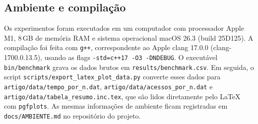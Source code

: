 \subsection{Ambiente e compilação}

Os experimentos foram executados em um computador com processador Apple M1, 8\,GB de memória RAM e sistema operacional macOS 26.3 (build 25D125). A compilação foi feita com \texttt{g++}, correspondente ao Apple clang 17.0.0 (clang-1700.0.13.5), usando as flags \texttt{-std=c++17 -O3 -DNDEBUG}. O executável \texttt{bin/benchmark} grava os dados brutos em \texttt{results/benchmark.csv}. Em seguida, o script \texttt{scripts/export\_latex\_plot\_data.py} converte esses dados para \texttt{artigo/data/tempo\_por\_n.dat}, \texttt{artigo/data/acessos\_por\_n.dat} e \texttt{artigo/data/tabela\_resumo.inc.tex}, que são lidos diretamente pelo \LaTeX{} com \texttt{pgfplots}. As mesmas informações de ambiente ficam registradas em \texttt{docs/AMBIENTE.md} no repositório do projeto.
